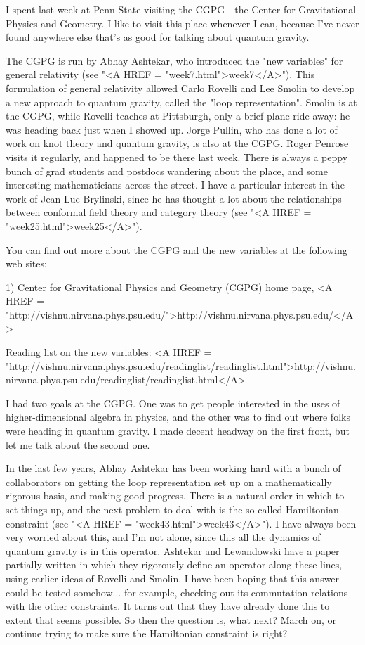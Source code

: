 

I spent last week at Penn State visiting the CGPG - the Center for
Gravitational Physics and Geometry.  I like to visit this place whenever
I can, because I've never found anywhere else that's as good for talking
about quantum gravity.

The CGPG is run by Abhay Ashtekar, who introduced the "new variables"
for general relativity (see "<A HREF = "week7.html">week7</A>").  This formulation of general
relativity allowed Carlo Rovelli and Lee Smolin to develop a new
approach to quantum gravity, called the "loop representation".  Smolin
is at the CGPG, while Rovelli teaches at Pittsburgh, only a brief plane
ride away: he was heading back just when I showed up.  Jorge Pullin, who
has done a lot of work on knot theory and quantum gravity, is also at
the CGPG.  Roger Penrose visits it regularly, and happened to be there
last week.  There is always a peppy bunch of grad students and postdocs
wandering about the place, and some interesting mathematicians across
the street.  I have a particular interest in the work of Jean-Luc
Brylinski, since he has thought a lot about the relationships between
conformal field theory and category theory (see "<A HREF = "week25.html">week25</A>").

You can find out more about the CGPG and the new variables at the
following web sites: 

1) Center for Gravitational Physics and Geometry (CGPG) home page,
<A HREF =
"http://vishnu.nirvana.phys.psu.edu/">http://vishnu.nirvana.phys.psu.edu/</A>

Reading list on the new variables:
<A HREF =
"http://vishnu.nirvana.phys.psu.edu/readinglist/readinglist.html">http://vishnu.nirvana.phys.psu.edu/readinglist/readinglist.html</A>

I had two goals at the CGPG.  One was to get people interested in the
uses of higher-dimensional algebra in physics, and the other was to find
out where folks were heading in quantum gravity.  I made decent headway
on the first front, but let me talk about the second one.

In the last few years, Abhay Ashtekar has been working hard with a bunch
of collaborators on getting the loop representation set up on a
mathematically rigorous basis, and making good progress.  There is a
natural order in which to set things up, and the next problem to deal
with is the so-called Hamiltonian constraint (see "<A HREF = "week43.html">week43</A>").  I have
always been very worried about this, and I'm not alone, since this all
the dynamics of quantum gravity is in this operator.  Ashtekar and
Lewandowski have a paper partially written in which they rigorously
define an operator along these lines, using earlier ideas of Rovelli and
Smolin.  I have been hoping that this answer could be tested somehow...
for example, checking out its commutation relations with the other
constraints.  It turns out that they have already done this to extent that
seems possible.  So then the question is, what next?  March on, or
continue trying to make sure the Hamiltonian constraint is right?

